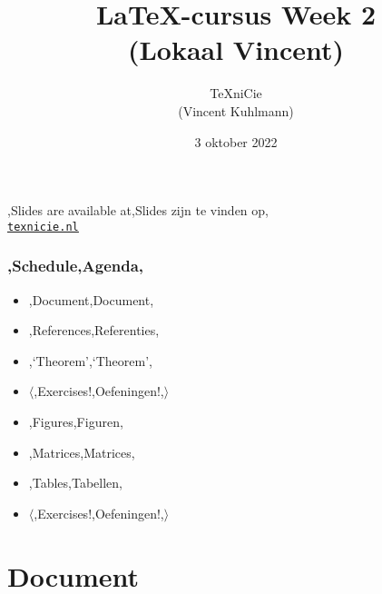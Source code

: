 \documentclass[
    dutch,
    everyoneauthor=true,
    darktheme,
    defaultSlideCollection=vincent,
    handout
]{../../cursuspresentatie}
\title[\LaTeX{}-cursus Week 2]{\LaTeX{}-cursus Week 2\\(Lokaal Vincent)}
\author[\TeX niCie]{\TeX niCie\\{\tiny (Vincent Kuhlmann)}}
\date{3 oktober 2022}
\let\placetarget\relax
\let\placetarget\relax
\begin{document}

\begin{frame}
    \titlepage
    \centering

    {\Large\lang,Slides are available at,Slides zijn te vinden op,\\
    \href{https://texnicie.nl}{\ul{\texttt{texnicie.nl}}}}
\end{frame}

\setul{1pt}{2pt}

\begin{frame}
    \frametitle{\lang,Schedule,Agenda,}
    
    \begin{itemize}
        \item \lang,Document,Document,
        \item \lang,References,Referenties,
        \item \lang,`Theorem',`Theorem',
        \item $ \langle $\lang,Exercises!,Oefeningen!,$ \rangle $
        \item \lang,Figures,Figuren,
        \item \lang,Matrices,Matrices,
        \item \lang,Tables,Tabellen,
        \item $ \langle $\lang,Exercises!,Oefeningen!,$ \rangle $
    \end{itemize}
\end{frame}

\section{Document}\label{sec:document}

\def\placetarget{\hypertarget{document}{}}

\end{document}
